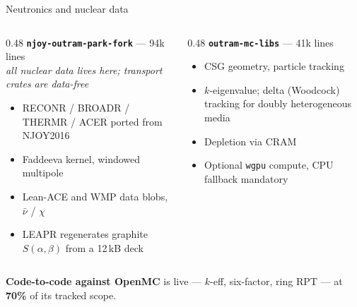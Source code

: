 \documentclass[aspectratio=169,11pt]{beamer}
\newcommand{\caveat}[1]{{\footnotesize\color{opmuted}\textit{#1}}}
\begin{document}
\begin{frame}{Neutronics and nuclear data}
  \begin{columns}[T]
    \begin{column}{0.48\textwidth}
      \textbf{\texttt{njoy-outram-park-fork}} --- 94k lines \\
      \caveat{all nuclear data lives here; transport crates are data-free}
      \begin{itemize}
        \item RECONR / BROADR / THERMR / ACER ported from NJOY2016 \cite{njoy2016}
        \item Faddeeva kernel, windowed multipole
        \item Lean-ACE and WMP data blobs, $\bar\nu$ / $\chi$
        \item LEAPR regenerates graphite $S(\alpha,\beta)$ from a 12\,kB deck
      \end{itemize}
    \end{column}
    \begin{column}{0.48\textwidth}
      \textbf{\texttt{outram-mc-libs}} --- 41k lines
      \begin{itemize}
        \item CSG geometry, particle tracking
        \item $k$-eigenvalue; delta (Woodcock) tracking for doubly heterogeneous media
        \item Depletion via CRAM \cite{pusa_cram}
        \item Optional \texttt{wgpu} compute, CPU fallback mandatory
      \end{itemize}
    \end{column}
  \end{columns}
  \vspace{0.8em}
  \textbf{Code-to-code against OpenMC} \cite{openmc} is live --- $k$-eff,
  six-factor, ring RPT --- at \textbf{70\%} of its tracked scope.
\end{frame}
\end{document}
